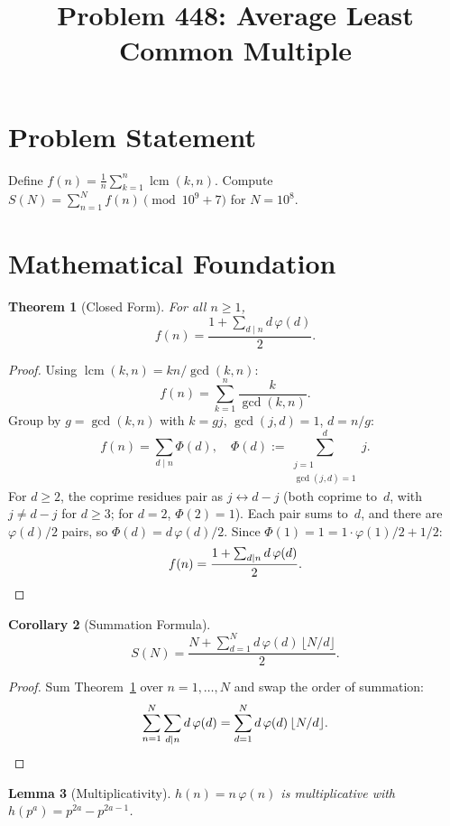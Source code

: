 \documentclass[12pt]{article}
\title{Problem 448: Average Least Common Multiple}
\author{}
\date{}
\newtheorem{theorem}{Theorem}
\newtheorem{lemma}[theorem]{Lemma}
\newtheorem{corollary}[theorem]{Corollary}
\begin{document}
\maketitle

\section{Problem Statement}
Define $f(n) = \frac{1}{n}\sum_{k=1}^{n} \operatorname{lcm}(k, n)$. Compute $S(N) = \sum_{n=1}^{N} f(n) \pmod{10^9 + 7}$ for $N = 10^8$.

\section{Mathematical Foundation}

\begin{theorem}[Closed Form]
\label{thm:closed}
For all $n \geq 1$,
\[
f(n) = \frac{1 + \displaystyle\sum_{d \mid n} d\,\varphi(d)}{2}.
\]
\end{theorem}

\begin{proof}
Using $\operatorname{lcm}(k,n) = kn/\gcd(k,n)$:
\[
f(n) = \sum_{k=1}^{n} \frac{k}{\gcd(k,n)}.
\]
Group by $g = \gcd(k,n)$ with $k = gj$, $\gcd(j, d) = 1$, $d = n/g$:
\[
f(n) = \sum_{d \mid n} \Phi(d), \quad \Phi(d) := \sum_{\substack{j=1\\\gcd(j,d)=1}}^{d} j.
\]
For $d \geq 2$, the coprime residues pair as $j \leftrightarrow d - j$ (both coprime to~$d$, with $j \neq d-j$ for $d \geq 3$; for $d = 2$, $\Phi(2) = 1$). Each pair sums to~$d$, and there are $\varphi(d)/2$ pairs, so $\Phi(d) = d\,\varphi(d)/2$. Since $\Phi(1) = 1 = 1 \cdot \varphi(1)/2 + 1/2$:
\[
f(n) = \frac{1 + \sum_{d \mid n} d\,\varphi(d)}{2}.\qedhere
\]
\end{proof}

\begin{corollary}[Summation Formula]
\[
S(N) = \frac{N + \displaystyle\sum_{d=1}^{N} d\,\varphi(d)\,\lfloor N/d \rfloor}{2}.
\]
\end{corollary}

\begin{proof}
Sum Theorem~\ref{thm:closed} over $n = 1, \ldots, N$ and swap the order of summation:
\[
\sum_{n=1}^{N}\sum_{d \mid n} d\,\varphi(d) = \sum_{d=1}^{N} d\,\varphi(d)\,\lfloor N/d \rfloor.\qedhere
\]
\end{proof}

\begin{lemma}[Multiplicativity]
$h(n) = n\,\varphi(n)$ is multiplicative with $h(p^a) = p^{2a} - p^{2a-1}$.
\end{lemma}
\end{document}
